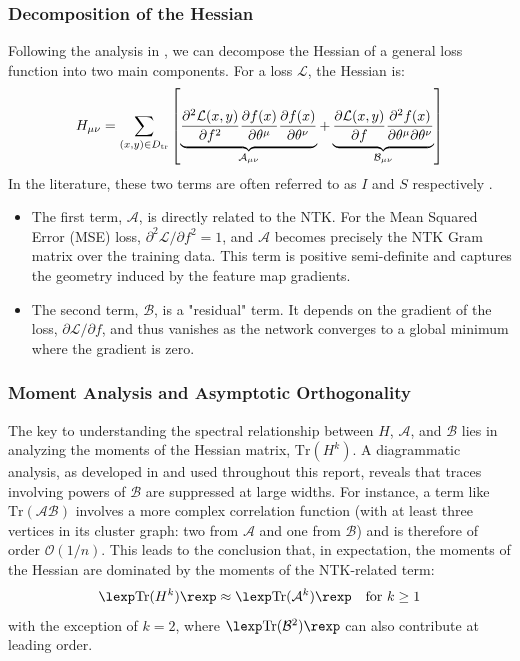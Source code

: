 \documentclass[a4paper]{article}
\theoremstyle{plain}
\theoremstyle{definition}
\theoremstyle{remark}
\begin{document}
\subsubsection{Decomposition of the Hessian}
Following the analysis in \cite{dyer2019asymptotics}, we can decompose the Hessian of a general loss function into two main components. For a loss $\mathcal{L}$, the Hessian is:
\begin{equation}
H_{\mu\nu} = \sum_{(x,y)\in D_{\rm tr}}\left[\underbrace{\frac{\partial^{2}\mathcal{L}(x,y)}{\partial f^{2}}\frac{\partial f(x)}{\partial\theta^{\mu}}\frac{\partial f(x)}{\partial\theta^{\nu}}}_{\mathcal{A}_{\mu\nu}}
+ \underbrace{\frac{\partial\mathcal{L}(x,y)}{\partial f}\frac{\partial^{2}f(x)}{\partial\theta^{\mu}\partial\theta^{\nu}}}_{\mathcal{B}_{\mu\nu}}\right]
\end{equation}
In the literature, these two terms are often referred to as $I$ and $S$ respectively \cite{jacot2020kernelhessian}.
\begin{itemize}
    \item The first term, $\mathcal{A}$, is directly related to the NTK. For the Mean Squared Error (MSE) loss, $\partial^2\mathcal{L}/\partial f^2 = 1$, and $\mathcal{A}$ becomes precisely the NTK Gram matrix over the training data. This term is positive semi-definite and captures the geometry induced by the feature map gradients.
    \item The second term, $\mathcal{B}$, is a "residual" term. It depends on the gradient of the loss, $\partial\mathcal{L}/\partial f$, and thus vanishes as the network converges to a global minimum where the gradient is zero.
\end{itemize}

\subsubsection{Moment Analysis and Asymptotic Orthogonality}
The key to understanding the spectral relationship between $H$, $\mathcal{A}$, and $\mathcal{B}$ lies in analyzing the moments of the Hessian matrix, $\mathrm{Tr}(H^k)$.
A diagrammatic analysis, as developed in \cite{dyer2019asymptotics} and used throughout this report, reveals that traces involving powers of $\mathcal{B}$ are suppressed at large widths. For instance, a term like $\mathrm{Tr}(\mathcal{A}\mathcal{B})$ involves a more complex correlation function (with at least three vertices in its cluster graph: two from $\mathcal{A}$ and one from $\mathcal{B}$) and is therefore of order $\mathcal{O}(1/n)$. This leads to the conclusion that, in expectation, the moments of the Hessian are dominated by the moments of the NTK-related term:
\begin{equation}
\lexp \mathrm{Tr}(H^k) \rexp \approx \lexp \mathrm{Tr}(\mathcal{A}^k) \rexp \quad \text{for } k \ge 1
\end{equation}
with the exception of $k=2$, where $\lexp \mathrm{Tr}(\mathcal{B}^2) \rexp$ can also contribute at leading order.
\end{document}
